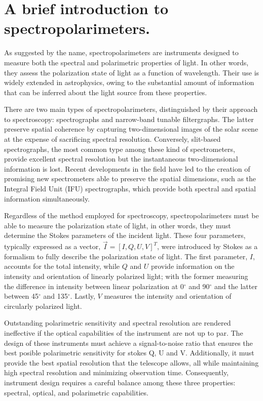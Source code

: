 \section{A brief introduction to spectropolarimeters.}

As suggested by the name, spectropolarimeters are instruments designed to measure both the spectral and polarimetric properties of light. In other words, they assess the polarization state of light as a function of wavelength. Their use is widely extended in astrophysics, owing to the substantial amount of information that can be inferred about the light source from these properties.

There are two main types of spectropolarimeters, distinguished by their approach to spectroscopy: spectrographs and narrow-band tunable filtergraphs. The latter preserve spatial coherence by capturing two-dimensional images of the solar scene at the expense of sacrificing spectral resolution. Conversely, slit-based spectrographs, the most common type among these kind of spectrometers, provide excellent spectral resolution but the instantaneous two-dimensional information is lost. Recent developments in the field have led to the creation of promising new spectrometers able to preserve the spatial dimensions, such as the Integral Field Unit (IFU) spectrographs, which provide both spectral and spatial information simultaneously. 

Regardless of the method employed for spectroscopy, spectropolarimeters must be able to measure the polarization state of light, in other words, they must determine the Stokes parameters of the incident light. These four parameters, typically expressed as a vector, $ \vec{I} = [I, Q, U, V] ^{T}$, were introduced by Stokes \citep{Stokes_vector} as a formalism to fully describe the polarization state of light. The first parameter, $I$, accounts for the total intensity, while $Q$ and $U$ provide information on the intensity and orientation of linearly polarized light; with the former measuring the difference in intensity between linear polarization at 0$^{\circ}$ and 90$^{\circ}$ and the latter between 45$^{\circ}$ and 135$^{\circ}$. Lastly, $V$ measures the intensity and orientation of circularly polarized light. 

Outstanding polarimetric sensitivity and spectral resolution are rendered ineffective if the optical capabilities of the instrument are not up to par. The design of these instruments must achieve a signal-to-noise ratio that ensures the best posible polarimetric sensitivity for stokes Q, U and V. Additionally, it must provide the best spatial resolution that the telescope allows, all while maintaining high spectral resolution and minimizing observation time. Consequently, instrument design requires a careful balance among these three properties: spectral, optical, and polarimetric capabilities.

